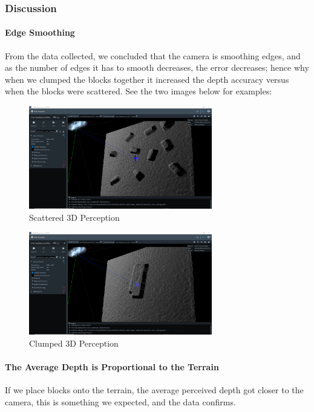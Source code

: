 \documentclass{article}
\begin{document}
		\newpage
		\subsubsection{Discussion}
			\paragraph{Edge Smoothing}
			From the data collected, we concluded that the camera is smoothing edges, and as the number of edges it has to smooth decreases, the error decreases; hence why when we clumped the blocks together it increased the depth accuracy versus when the blocks were scattered. See the two images below for examples:
			
			\begin{figure}[h]
				\includegraphics[width=8cm]{./images/part_1/scattered.png}
				\centering
				\caption{Scattered 3D Perception}
				\label{fig:p1_discussion_scattered}
			\end{figure}
			
			\begin{figure}[h]
				\includegraphics[width=8cm]{./images/part_1/clumped.png}
				\centering
				\caption{Clumped 3D Perception}
				\label{fig:p1_discussion_clumped}
			\end{figure}
			
			\paragraph{The Average Depth is Proportional to the Terrain}
			If we place blocks onto the terrain, the average perceived depth got closer to the camera, this is something we expected, and the data confirms.
			
\end{document}
